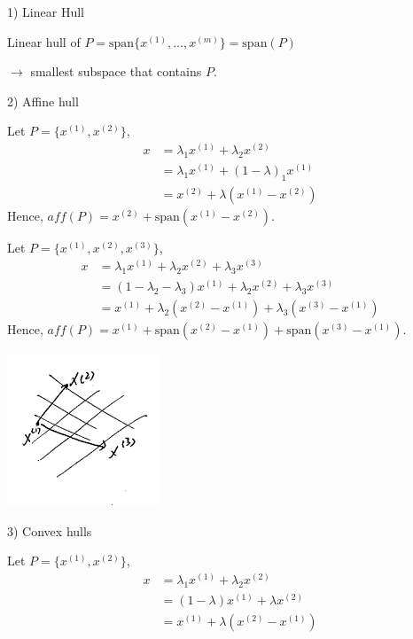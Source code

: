1) Linear Hull

Linear hull of $P = \text{span}\{x^{(1)},...,x^{(m)} \} =\text{span}(P)$

$\rightarrow$ smallest subspace that contains $P$.

2) Affine hull

Let $P = \{x^{(1)}, x^{(2)} \}$, 
\begin{align*}
x &= \lambda_1x^{(1)} + \lambda_2x^{(2)}\\
&= \lambda_1x^{(1)} + (1-\lambda)_1x^{(1)}\\
&= x^{(2)} + \lambda(x^{(1)} - x^{(2)})
\end{align*}
Hence, $aff(P) = x^{(2)} + \text{span}(x^{(1)} - x^{(2)})$.

\vspace{0.3cm}
Let $P = \{x^{(1)}, x^{(2)}, x^{(3)} \}$,
\begin{align*}
x &= \lambda_1x^{(1)} + \lambda_2x^{(2)} + \lambda_3x^{(3)}\\
&= (1 - \lambda_2 - \lambda_3)x^{(1)} + \lambda_2x^{(2)} + \lambda_3x^{(3)}\\
&= x^{(1)} + \lambda_2(x^{(2)} - x^{(1)}) + \lambda_3(x^{(3)} - x^{(1)})
\end{align*}
Hence,  $aff(P) = x^{(1)} + \text{span}(x^{(2)} - x^{(1)}) + \text{span}(x^{(3)} - x^{(1)})$.


\begin{marginfigure}
	\centering
	\includegraphics[width=1.8in,height=1.8in]{figures/ch08/figure1023_1.png}
\end{marginfigure}

3) Convex hulls

Let $P = \{x^{(1)},  x^{(2)}\}$,
\begin{align*}
x 
&= \lambda_1x^{(1)} + \lambda_2x^{(2)}\\
&= (1-\lambda)x^{(1)} + \lambda x^{(2)}\\
&= x^{(1)} + \lambda(x^{(2)} - x^{(1)})
\end{align*}


